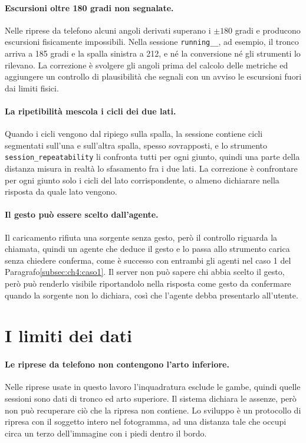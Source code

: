 \paragraph{Escursioni oltre 180 gradi non segnalate.} Nelle riprese da telefono
alcuni angoli derivati superano i $\pm180$ gradi e producono escursioni
fisicamente impossibili. Nella sessione \texttt{running\_\_}, ad
esempio, il tronco arriva a 185 gradi e la spalla sinistra a 212, e né la
conversione né gli strumenti lo rilevano. La correzione è svolgere gli angoli prima del
calcolo delle metriche ed aggiungere un controllo di plausibilità che segnali con
un avviso le escursioni fuori dai limiti fisici.

\paragraph{La ripetibilità mescola i cicli dei due lati.} Quando i cicli vengono
dal ripiego sulla spalla, la sessione contiene cicli segmentati sull'una e
sull'altra spalla, spesso sovrapposti, e lo strumento
\texttt{session\_repeatability} li confronta tutti per ogni giunto, quindi una parte della distanza misura in realtà
lo sfasamento fra i due lati. La correzione è confrontare per ogni giunto solo i
cicli del lato corrispondente, o almeno dichiarare nella risposta da quale lato vengono.

\paragraph{Il gesto può essere scelto dall'agente.} Il caricamento rifiuta una
sorgente senza gesto, però il controllo riguarda la chiamata, quindi un agente che
deduce il gesto e lo passa allo strumento carica senza chiedere conferma, come è
successo con entrambi gli agenti nel caso 1 del
Paragrafo\ref{subsec:ch4:caso1}. Il server non può sapere chi abbia scelto il
gesto, però può renderlo visibile riportandolo nella risposta come gesto da
confermare quando la sorgente non lo dichiara, così che l'agente debba
presentarlo all'utente.

\section{I limiti dei dati}
\label{sec:ch6:dati}

\paragraph{Le riprese da telefono non contengono l'arto inferiore.} Nelle riprese
usate in questo lavoro l'inquadratura esclude le gambe, quindi quelle sessioni
sono dati di tronco ed arto superiore. Il sistema dichiara le assenze, però non può
recuperare ciò che la ripresa non contiene. Lo sviluppo è un protocollo di ripresa
con il soggetto intero nel fotogramma, ad una distanza tale che occupi circa un
terzo dell'immagine con i piedi dentro il bordo.

